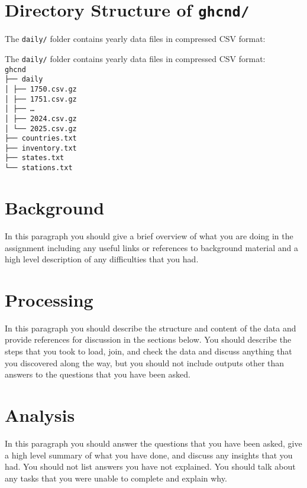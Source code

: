 \documentclass[11pt]{article}
\begin{document}
\section*{Directory Structure of \texttt{ghcnd/}}

The \texttt{daily/} folder contains yearly data files in compressed CSV format:

\bigskip
\noindent The \texttt{daily/} folder contains yearly data files in compressed CSV format:
\texttt{%
\\
ghcnd\\
├── daily\\
│   ├── 1750.csv.gz\\
│   ├── 1751.csv.gz\\
│   ├── \ldots\\
│   ├── 2024.csv.gz\\
│   └── 2025.csv.gz\\
├── countries.txt\\
├── inventory.txt\\
├── states.txt\\
└── stations.txt
}


\section{Background}

In this paragraph you should give a brief overview of what you are doing in the assignment including any useful links or references to background material and a high level description of any difficulties that you had.

\section{Processing}

In this paragraph you should describe the structure and content of the data and provide references for discussion in the sections below. You should describe the steps that you took to load, join, and check the data and discuss anything that you discovered along the way, but you should not include outputs other than answers to the questions that you have been asked.

\section{Analysis}

In this paragraph you should answer the questions that you have been asked, give a high level summary of what you have done, and discuss any insights that you had. You should not list answers you have not explained. You should talk about any tasks that you were unable to complete and explain why.
\end{document}
